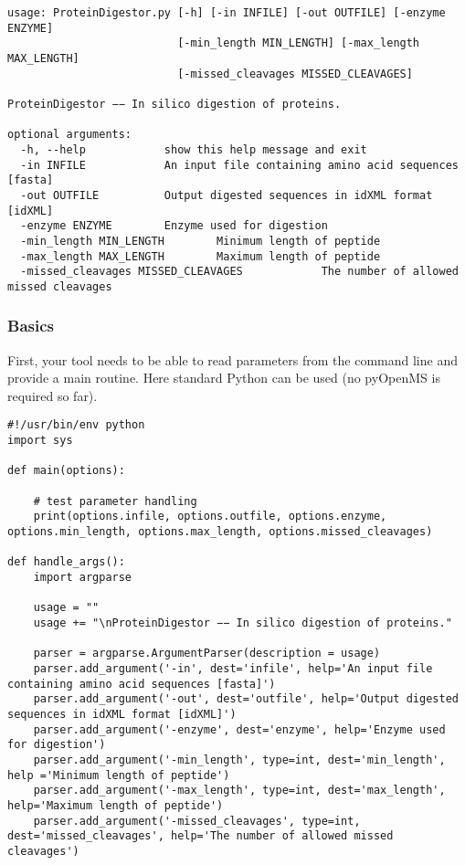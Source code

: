 {\begin{lstlisting}
usage: ProteinDigestor.py [-h] [-in INFILE] [-out OUTFILE] [-enzyme ENZYME]
                          [-min_length MIN_LENGTH] [-max_length MAX_LENGTH]
                          [-missed_cleavages MISSED_CLEAVAGES]

ProteinDigestor −− In silico digestion of proteins.

optional arguments:
  -h, --help            show this help message and exit
  -in INFILE            An input file containing amino acid sequences [fasta]
  -out OUTFILE          Output digested sequences in idXML format [idXML]
  -enzyme ENZYME        Enzyme used for digestion
  -min_length MIN_LENGTH		Minimum length of peptide
  -max_length MAX_LENGTH		Maximum length of peptide
  -missed_cleavages MISSED_CLEAVAGES			The number of allowed missed cleavages
\end{lstlisting}

\subsubsection{Basics}
First, your tool needs to be able to read parameters from the command line and provide a main routine. Here standard Python can be used (no pyOpenMS is required so far).

\begin{lstlisting}
#!/usr/bin/env python
import sys

def main(options):

    # test parameter handling
    print(options.infile, options.outfile, options.enzyme, options.min_length, options.max_length, options.missed_cleavages)

def handle_args():
    import argparse

    usage = ""
    usage += "\nProteinDigestor −− In silico digestion of proteins."

    parser = argparse.ArgumentParser(description = usage)
    parser.add_argument('-in', dest='infile', help='An input file containing amino acid sequences [fasta]')
    parser.add_argument('-out', dest='outfile', help='Output digested sequences in idXML format [idXML]')
    parser.add_argument('-enzyme', dest='enzyme', help='Enzyme used for digestion')
    parser.add_argument('-min_length', type=int, dest='min_length', help ='Minimum length of peptide')
    parser.add_argument('-max_length', type=int, dest='max_length', help='Maximum length of peptide')
    parser.add_argument('-missed_cleavages', type=int, dest='missed_cleavages', help='The number of allowed missed cleavages')


\end{lstlisting}}
